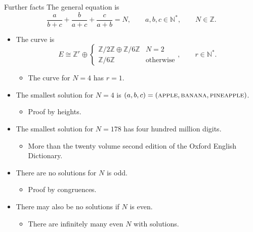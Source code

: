 \documentclass[8pt,t]{beamer}
\newcommand{\rb}[1]{\left( #1 \right)}
\newcommand{\Z}{\mathbb{Z}}
\newcommand{\N}{\mathbb{N}}
\begin{document}
\begin{frame}{Further facts}
The general equation is
$$ \dfrac{a}{b + c} + \dfrac{b}{a + c} + \dfrac{c}{a + b} = N, \qquad a, b, c \in \N^*, \qquad N \in \Z. $$
\begin{itemize}
\item<2-> The curve is
$$ E \cong \Z^r \oplus
\begin{cases}
\Z / 2\Z \oplus \Z / 6\Z & N = 2 \\
\Z / 6\Z & \text{otherwise}
\end{cases},
\qquad r \in \N^*. $$
\begin{itemize}
\item<3-> The curve for $ N = 4 $ has $ r = 1 $.
\end{itemize}
\item<4-> The smallest solution for $ N = 4 $ is $ \rb{a, b, c} = \rb{\textsc{apple}, \textsc{banana}, \textsc{pineapple}} $.
\begin{itemize}
\item<5-> Proof by heights.
\end{itemize}
\item<6-> The smallest solution for $ N = 178 $ has four hundred million digits.
\begin{itemize}
\item<7-> More than the twenty volume second edition of the Oxford English Dictionary.
\end{itemize}
\item<8-> There are no solutions for $ N $ is odd.
\begin{itemize}
\item<9-> Proof by congruences.
\end{itemize}
\item<10-> There may also be no solutions if $ N $ is even.
\begin{itemize}
\item<11-> There are infinitely many even $ N $ with solutions.
\end{itemize}
\end{itemize}
\end{frame}
\end{document}
